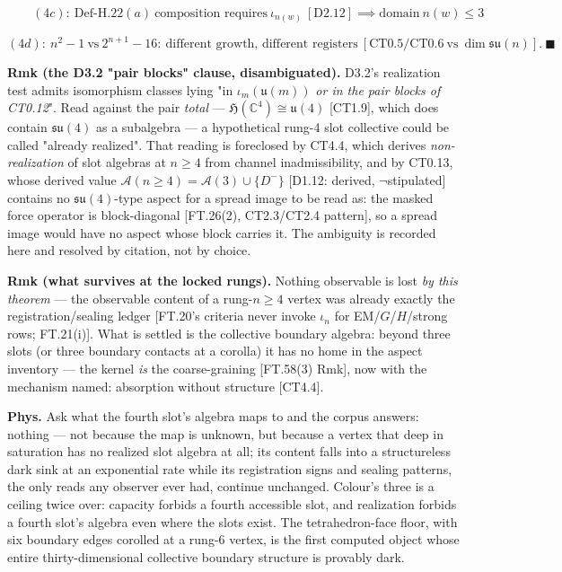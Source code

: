 \documentclass[11pt,openany]{report}
\theoremstyle{canonplain}
\theoremstyle{canondef}
\begin{document}
\[
\qquad (4c):\ \mathrm{Def\text{-}H.22}(a)\ \text{composition requires}\ \iota_{n(w)}\ [\mathrm{D2.12}]\implies\text{domain}\ n(w)\le3
\]

\[
(4d):\ n^2-1\ \text{vs}\ 2^{n+1}-16:\ \text{different growth, different registers}\ [\mathrm{CT0.5}/\mathrm{CT0.6}\ \text{vs}\ \dim\mathfrak{su}(n)].\ \blacksquare
\]

\textbf{Rmk (the D3.2 "pair blocks" clause, disambiguated).} D3.2's realization test admits isomorphism classes lying "in $\iota_m(\mathfrak u(m))$ \textit{or in the pair blocks of CT0.12}". Read against the pair \textit{total} — $\mathfrak H(\mathbb C^4)\cong\mathfrak u(4)$ [CT1.9], which does contain $\mathfrak{su}(4)$ as a subalgebra — a hypothetical rung-4 slot collective could be called "already realized". That reading is foreclosed by CT4.4, which derives \textit{non-realization} of slot algebras at $n\ge4$ from channel inadmissibility, and by CT0.13, whose derived value $\mathcal A(n\ge4)=\mathcal A(3)\cup\{D^-\}$ [D1.12: derived, $\neg$stipulated] contains no $\mathfrak{su}(4)$-type aspect for a spread image to be read as: the masked force operator is block-diagonal [FT.26(2), CT2.3/CT2.4 pattern], so a spread image would have no aspect whose block carries it. The ambiguity is recorded here and resolved by citation, not by choice.

\textbf{Rmk (what survives at the locked rungs).} Nothing observable is lost \textit{by this theorem} — the observable content of a rung-$n\ge4$ vertex was already exactly the registration/sealing ledger [FT.20's criteria never invoke $\iota_n$ for EM/$G$/$H$/strong rows; FT.21(i)]. What is settled is the collective boundary algebra: beyond three slots (or three boundary contacts at a corolla) it has no home in the aspect inventory — the kernel \textit{is} the coarse-graining [FT.58(3) Rmk], now with the mechanism named: absorption without structure [CT4.4].

\textbf{Phys.} Ask what the fourth slot's algebra maps to and the corpus answers: nothing — not because the map is unknown, but because a vertex that deep in saturation has no realized slot algebra at all; its content falls into a structureless dark sink at an exponential rate while its registration signs and sealing patterns, the only reads any observer ever had, continue unchanged. Colour's three is a ceiling twice over: capacity forbids a fourth accessible slot, and realization forbids a fourth slot's algebra even where the slots exist. The tetrahedron-face floor, with six boundary edges corolled at a rung-6 vertex, is the first computed object whose entire thirty-dimensional collective boundary structure is provably dark.
\end{document}
